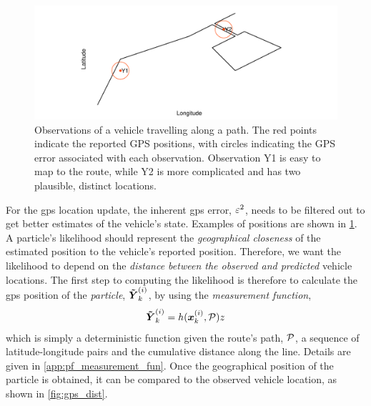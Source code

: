 \begin{knitrout}\small
{}\color{fgcolor}\begin{figure}
\includegraphics[width=\maxwidth]{figure/lhood_obs-1} \caption[Observations of a vehicle travelling along a path]{Observations of a vehicle travelling along a path. The red points indicate the reported GPS positions, with circles indicating the GPS error associated with each observation. Observation Y1 is easy to map to the route, while Y2 is more complicated and has two plausible, distinct locations.}\label{fig:lhood_obs}
\end{figure}


\end{knitrout}





For the \gls{gps} location update, the inherent \gls{gps} error, $\varepsilon^2$, needs to be filtered out to get better estimates of the vehicle's state. Examples of positions are shown in \cref{fig:lhood_obs}. A particle's likelihood should represent the \emph{geographical closeness} of the estimated position to the vehicle's reported position. Therefore, we want the likelihood to depend on the \emph{distance between the observed and predicted} vehicle locations. The first step to computing the likelihood is therefore to calculate the \gls{gps} position of the \emph{particle}, $\boldsymbol{\tilde Y}^{(i)}_k$, by using the \emph{measurement function},
\begin{equation}
\label{eq:pf_measurement_fun}
\boldsymbol{\tilde Y}^{(i)}_k = h(\boldsymbol x^{(i)}_k, \mathcal{P})z
\end{equation}
which is simply a deterministic function given the route's path, $\mathcal{P}$, a sequence of latitude-longitude pairs and the cumulative distance along the line. Details are given in \cref{app:pf_measurement_fun}. Once the geographical position of the particle is obtained, it can be compared to the observed vehicle location, as shown in \cref{fig:gps_dist}.

